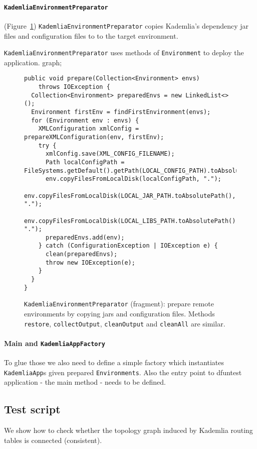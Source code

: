 \paragraph{\texttt{KademliaEnvironmentPreparator}} (Figure~\ref{fig:prepare})
\texttt{KademliaEnvironmentPreparator} copies Kademlia's dependency jar files and configuration
files to to the target environment.

\texttt{KademliaEnvironmentPreparator} uses methods of \texttt{Environment} to deploy the application.
graph;
\begin{figure}[tbp]
\begin{lstlisting}
public void prepare(Collection<Environment> envs)
    throws IOException {
  Collection<Environment> preparedEnvs = new LinkedList<>();
  Environment firstEnv = findFirstEnvironment(envs);
  for (Environment env : envs) {
    XMLConfiguration xmlConfig = prepareXMLConfiguration(env, firstEnv);
    try {
      xmlConfig.save(XML_CONFIG_FILENAME);
      Path localConfigPath = FileSystems.getDefault().getPath(LOCAL_CONFIG_PATH).toAbsolutePath();
      env.copyFilesFromLocalDisk(localConfigPath, ".");
      env.copyFilesFromLocalDisk(LOCAL_JAR_PATH.toAbsolutePath(), ".");
      env.copyFilesFromLocalDisk(LOCAL_LIBS_PATH.toAbsolutePath(), ".");
      preparedEnvs.add(env);
    } catch (ConfigurationException | IOException e) {
      clean(preparedEnvs);
      throw new IOException(e);
    }
  }
}
\end{lstlisting}
\caption{\texttt{KademliaEnvironmentPreparator} (fragment): prepare remote environments by copying jars and configuration files. Methods \texttt{restore}, \texttt{collectOutput}, \texttt{cleanOutput} and \texttt{cleanAll} are similar.}
\label{fig:prepare}
\end{figure}


\paragraph{Main and \texttt{KademliaAppFactory}} To glue those we also need to
define a simple factory which instantiates \texttt{KademliaApp}s given prepared
\texttt{Environments}. Also the entry point to dfuntest application - the main
method - needs to be defined.

\subsection{Test script}

We show how to check whether the topology graph induced by Kademlia routing
tables is connected (consistent).


